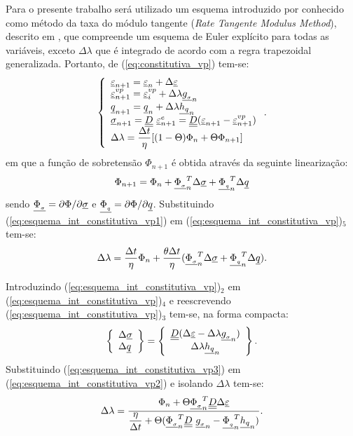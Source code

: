 Para o presente trabalho será utilizado um esquema introduzido por  conhecido como método da taxa do módulo tangente (\textit{Rate Tangente Modulus Method}), descrito em , que compreende um esquema de Euler explícito para todas as variáveis, exceto $\Delta \lambda$ que é integrado de acordo com a regra trapezoidal generalizada. Portanto, de (\ref{eq:constitutiva_vp}) tem-se:
\begin{equation}
	\label{eq:esquema_int_constitutiva_vp}
	\left\{
	\begin{array}{lcl}
		\underline{\varepsilon}_{n+1} = \underline{\varepsilon}_n + \Delta \underline{\varepsilon} \\
		\underline{\varepsilon}_{n+1}^{vp} = \underline{\varepsilon}_i^{vp} + \Delta \lambda \underline{g_{_\sigma}}_n \\
		\underline q_{n+1} = \underline q_n + \Delta \lambda \underline{h_q}_n \\	
		\underline \sigma_{n+1} = \underline{\underline D}~\underline{\varepsilon}_{n+1}^e = \underline{\underline D}(\underline{\varepsilon}_{n+1} - \underline{\varepsilon}_{n+1}^{vp}) \\
		\Delta \lambda = \dfrac{\Delta t}{\eta}[(1-\Theta)\Phi_n + \Theta \Phi_{n+1}]
	\end{array}
	\right..
\end{equation}
em que a função de sobretensão $\Phi_{n+1}$ é obtida através da seguinte linearização:
\begin{equation}
	\label{eq:esquema_int_constitutiva_vp1}
	\Phi_{n+1} = \Phi_n + \underline{\Phi_{_\sigma}}_n^T \Delta \underline \sigma + \underline{\Phi_{_q}}_n^T \Delta \underline q
\end{equation}
sendo $\underline{\Phi_{_\sigma}} = \partial \Phi / \partial \underline \sigma$ e $\underline{\Phi_{_q}} = \partial \Phi / \partial \underline q$. Substituindo (\ref{eq:esquema_int_constitutiva_vp1}) em (\ref{eq:esquema_int_constitutiva_vp})$_5$ tem-se:
\begin{equation}
	\label{eq:esquema_int_constitutiva_vp2}
	\Delta \lambda = \dfrac{\Delta t}{\eta} \Phi_n + \dfrac{\theta \Delta t}{\eta}(\underline{\Phi_{_\sigma}}_n^T \Delta \underline \sigma + \underline{\Phi_{_q}}_n^T \Delta \underline q).
\end{equation}

Introduzindo (\ref{eq:esquema_int_constitutiva_vp})$_2$ em (\ref{eq:esquema_int_constitutiva_vp})$_4$ e reescrevendo (\ref{eq:esquema_int_constitutiva_vp})$_3$ tem-se, na forma compacta:
\begin{equation}
	\label{eq:esquema_int_constitutiva_vp3}
	\left\{ \begin{array}{lcl} \Delta \underline \sigma \\ \Delta \underline q \end{array} \right\} = \left\{ \begin{array}{ccc} \underline{\underline D}(\Delta\underline{\varepsilon} -\Delta \lambda \underline{g_{_\sigma}}_n) \\ \Delta \lambda \underline{h_q}_n \end{array} \right\}.
\end{equation}
Substituindo (\ref{eq:esquema_int_constitutiva_vp3}) em (\ref{eq:esquema_int_constitutiva_vp2}) e isolando $\Delta \lambda$ tem-se:
\begin{equation}
	\label{eq:esquema_int_constitutiva_vp4}
	\Delta \lambda = \dfrac{\Phi_n + \Theta \underline{\Phi_{_\sigma}}_n^T\underline{\underline D}\Delta\underline{\varepsilon}}{\dfrac{\eta}{\Delta t} + \Theta (\underline{\Phi_{_\sigma}}_n^T\underline{\underline D}~\underline{g_{_\sigma}}_n - \underline{\Phi_{_q}}_n^T \underline{h_q}_n)}.
\end{equation}

